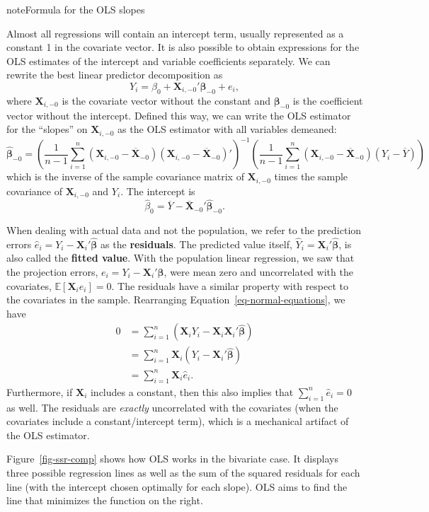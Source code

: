 \documentclass[
  13pt,
  letterpaper,
  DIV=11,
  numbers=noendperiod]{scrreprt}
\newcommand{\mb}{\bm}
\newcommand{\E}{\mathbb{E}}
\newcommand{\X}{\mb{X}}
\newcommand{\bfbeta}{\mb{\beta}}
\newcommand{\bhat}{\widehat{\mb{\beta}}}
\theoremstyle{plain}
\theoremstyle{plain}
\theoremstyle{definition}
\theoremstyle{definition}
\theoremstyle{remark}
\begin{document}
\begin{bookcallout}{note}{Formula for the OLS slopes}

Almost all regressions will contain an intercept term, usually
represented as a constant 1 in the covariate vector. It is also possible
to obtain expressions for the OLS estimates of the intercept and
variable coefficients separately. We can rewrite the best linear
predictor decomposition as \[ 
Y_{i} = \beta_{0} + \X_{i,-0}'\bfbeta_{-0} + e_{i},
\] where \(\X_{i,-0}\) is the covariate vector without the constant and
\(\bfbeta_{-0}\) is the coefficient vector without the intercept.
Defined this way, we can write the OLS estimator for the ``slopes'' on
\(\X_{i,-0}\) as the OLS estimator with all variables demeaned: \[ 
\bhat_{-0} = \left(\frac{1}{n-1} \sum_{i=1}^{n} (\X_{i,-0} - \overline{\X}_{-0})(\X_{i,-0} - \overline{\X}_{-0})'\right)^{-1} \left(\frac{1}{n-1} \sum_{i=1}^{n}(\X_{i,-0} - \overline{\X}_{-0})(Y_{i} - \overline{Y})\right)
\] which is the inverse of the sample covariance matrix of \(\X_{i,-0}\)
times the sample covariance of \(\X_{i,-0}\) and \(Y_i\). The intercept
is \[ 
\widehat{\beta}_0 = \overline{Y} - \overline{\X}_{-0}'\bhat_{-0}.
\]

\end{bookcallout}

When dealing with actual data and not the population, we refer to the
prediction errors \(\widehat{e}_{i} = Y_i - \X_i'\bhat\) as the
\textbf{residuals}. The predicted value itself,
\(\widehat{Y}_i = \X_{i}'\bhat\), is also called the \textbf{fitted
value}. With the population linear regression, we saw that the
projection errors, \(e_i = Y_i - \X_i'\bfbeta\), were mean zero and
uncorrelated with the covariates, \(\E[\X_{i}e_{i}] = 0\). The residuals
have a similar property with respect to the covariates in the sample.
Rearranging Equation~\ref{eq-normal-equations}, we have \[
\begin{aligned}
0 &= \sum_{i=1}^n (\X_iY_i -  \X_i\X_i'\bhat) \\
&= \sum_{i=1}^n \X_i(Y_i -  \X_i'\bhat) \\
&= \sum_{i=1}^n \X_i\widehat{e}_i.
\end{aligned}
\] Furthermore, if \(\X_i\) includes a constant, then this also implies
that \(\sum_{i=1}^n \widehat{e}_i = 0\) as well. The residuals are
\emph{exactly} uncorrelated with the covariates (when the covariates
include a constant/intercept term), which is a mechanical artifact of
the OLS estimator.

Figure~\ref{fig-ssr-comp} shows how OLS works in the bivariate case. It
displays three possible regression lines as well as the sum of the
squared residuals for each line (with the intercept chosen optimally for
each slope). OLS aims to find the line that minimizes the function on
the right.
\end{document}

